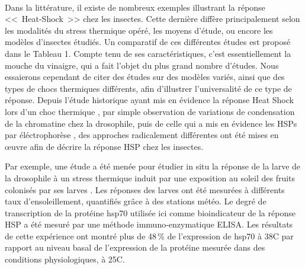 		\paragraph*{}


		Dans la littérature, il existe de nombreux exemples illustrant la réponse <<~Heat-Shock~>> chez les insectes.
		Cette dernière diffère principalement selon les modalités du stress thermique opéré, les moyens d'étude,  ou encore les modèles d'insectes étudiés. Un comparatif de ces différentes études est proposé dans le Tableau 1.
		Compte tenu de ses caractéristiques, c'est essentiellement la mouche du vinaigre,  qui a fait l'objet du plus grand nombre d'études.
		Nous essaierons cependant de citer des études sur des modèles variés, ainsi que des types de chocs thermiques différents, afin d'illustrer l'universalité de ce type de réponse.
		Depuis l'étude historique ayant mis en évidence la réponse Heat Shock lors d'un choc thermique \cite{ritossa1996}, par simple observation de variations de condensation de la chromatine chez la drosophile, puis de celle qui a mis en évidence les HSPs par éléctrophorèse \cite{tissieres1974}, 
		des approches radicalement différentes ont été mises en \oe{}uvre afin de décrire la réponse HSP chez les insectes.

		Par exemple, une étude a été menée pour étudier in situ la réponse de la larve de la drosophile à un stress thermique induit par une exposition au soleil des fruits colonisés par ses larves \cite{feder1997}.
		Les réponses des larves ont été mesurées à différents taux d'ensoleillement, quantifiés grâce à des stations météo.
		Le degré de transcription de la protéine hsp70 utilisée ici comme bioindicateur de la réponse HSP a été mesuré par une méthode immuno-enzymatique ELISA.
		Les résultats de cette expérience ont montré plus de 48\,\% de l'expression de hsp70 à 38\textdegree{}C par rapport au niveau basal de l'expression de la protéine mesurée dans des conditions physiologiques, à 25\textdegree{}C. 

